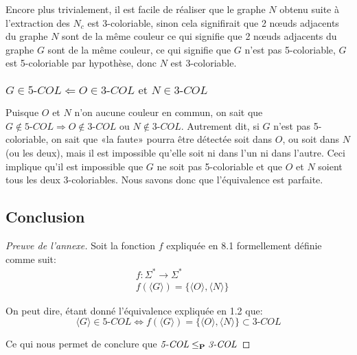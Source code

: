 \documentclass{article}
\newcommand\PP{{\normalfont{\textbf{P}}}}
\newcommand\col[1]{\textit{#1-COL}}
\newcommand\bk[1]{\langle #1 \rangle}
\begin{document}
Encore plus trivialement, il est facile de réaliser que le graphe $N$ obtenu suite à l'extraction des $N_c$ est 3-coloriable, sinon cela signifirait que 2 n\oe{}uds adjacents du graphe $N$ sont de la même couleur ce qui signifie que 2 n\oe{}uds adjacents du graphe $G$ sont de la même couleur, ce qui signifie que $G$ n'est pas 5-coloriable, $G$ est 5-coloriable par hypothèse, donc $N$ est 3-coloriable.

\subsubsection{\normalfont $G \in \col{5} \Leftarrow O \in \col{3} \text{  et  } N \in \col{3}$}
Puisque $O$ et $N$ n'on aucune couleur en commun, on sait que $G \notin \col{5} \Rightarrow O \notin \col{3} \text{  ou  } N \notin \col{3}$. Autrement dit, si $G$ n'est pas 5-coloriable, on sait que «la faute» pourra être détectée soit dans $O$, ou soit dans $N$ (ou les deux), mais il est impossible qu'elle soit ni dans l'un ni dans l'autre. Ceci implique qu'il est impossible que $G$ ne soit pas 5-coloriable et que $O$ et $N$ soient tous les deux 3-coloriables. Nous savons donc que l'équivalence est parfaite.

\subsection{Conclusion}
\begin{proof}[Preuve de l'annexe]
  Soit la fonction $f$ expliquée en 8.1 formellement définie comme suit:
  \begin{align*}
    &f: \Sigma^* \rightarrow \Sigma^* \\
    &f(\bk{G}) = \{\bk{O}, \bk{N}\}
  \end{align*}

  On peut dire, étant donné l'équivalence expliquée en 1.2 que:
  $$\bk{G} \in \col{5} \Leftrightarrow f(\bk{G}) = \{\bk{O}, \bk{N}\} \subset \col{3}$$

  Ce qui nous permet de conclure que $\col{5} \leq_\PP \col{3}$
\end{proof}
\end{document}
